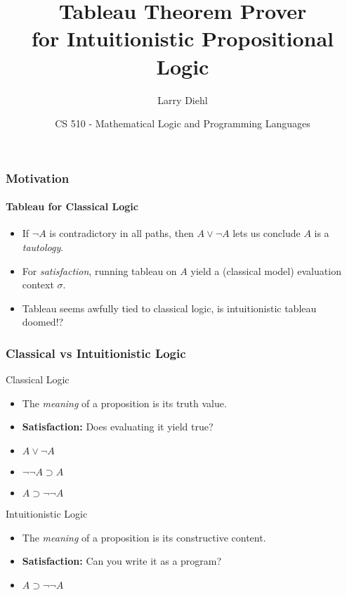 \documentclass[mathserif]{beamer}
\title{Tableau Theorem Prover\\ for Intuitionistic Propositional Logic}
\author{Larry Diehl}
\institute{Portland State University}
\date[Fall 2014]
{CS 510 - Mathematical Logic and Programming Languages}
\def\imp{\supset}
\begin{document}
\frame{\titlepage}

\begin{frame}
\frametitle{Motivation}
\framesubtitle{Tableau for Classical Logic}

\begin{itemize}
\item If $\neg A$ is contradictory in all paths, then $A \lor \neg A$
  lets us conclude $A$ is a {\it tautology}.
\item For {\it satisfaction}, running tableau on $A$ yield a
  (classical model) evaluation context $\sigma$.
\item Tableau seems awfully tied to classical logic, is intuitionistic
  tableau doomed!?
\end{itemize}



\end{frame}


\begin{frame}
\frametitle{Classical vs Intuitionistic Logic}

\begin{block}{Classical Logic}
\begin{itemize}
\item The {\it meaning} of a proposition is its truth value.
\item {\bf Satisfaction:} Does evaluating it yield true?
\item $A \lor \neg A$
\item $\neg\neg A \imp A$
\item $A \imp \neg\neg A$
\end{itemize}
\end{block}

\begin{block}{Intuitionistic Logic}
\begin{itemize}
\item The {\it meaning} of a proposition is its constructive content.
\item {\bf Satisfaction:} Can you write it as a program?
\item $A \imp \neg\neg A$
\end{itemize}
\end{block}

\end{frame}
\end{document}
